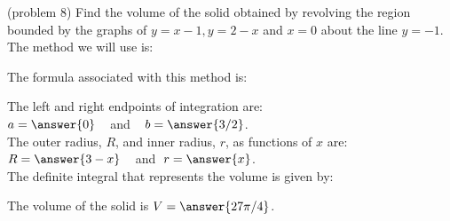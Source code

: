 \documentclass{ximera}
\begin{document}
\begin{problem}(problem 8)
Find the volume of the solid obtained by revolving the region bounded by the graphs of $y = x-1, y = 2- x$ and $x = 0$ about the line $y = -1$.\\
The method we will use is:
\begin{multipleChoice}
\end{multipleChoice}

The formula associated with this method is:
\begin{multipleChoice}
\end{multipleChoice}

The left and right endpoints of integration are:\\
$a = \answer{0}\;\;\;$ and $\;\;\; b = \answer{3/2}$.\\
The outer radius, $R$, and inner radius, $r$, as functions of $x$ are:\\
$R = \answer{3-x} \;\;\;$ and $\; r = \answer{x}$.\\

The definite integral that represents the volume is given by:\\
\begin{multipleChoice}
\end{multipleChoice}

The volume of the solid is $V = \answer{27\pi/4}$.

\end{problem}
\end{document}
